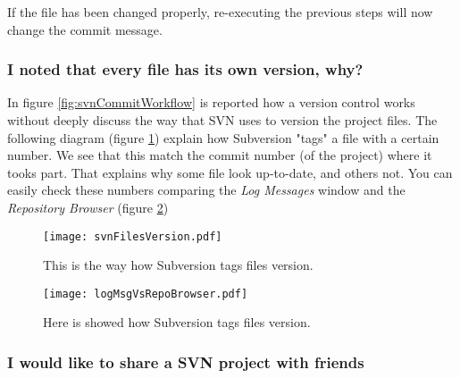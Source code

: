 

If the file has been changed properly, re-executing the previous steps will now change the commit message.







\subsubsection{I noted that every file has its own version, why?}
\label{subsubsectio:FileVersion}

In figure \ref{fig:svnCommitWorkflow} is reported how a version control works without deeply discuss the way that SVN uses to version the project files.
The following diagram (figure \ref{fig:svnFilesVersion}) explain how Subversion "tags" a file with a certain number. We see that this match the commit number (of the project) where it tooks part. That explains why some file look up-to-date, and others not. You can easily check these numbers comparing the \textit{Log Messages} window and the \textit{Repository Browser} (figure \ref{fig:logMsgVsRepoBrowser})



\begin{figure}[htbp]
    \centering
    \texttt{[image: svnFilesVersion.pdf]}
    \caption{This is the way how Subversion tags files version.}
    \label{fig:svnFilesVersion}
\end{figure}




\begin{figure}[htbp]
    \centering
    \texttt{[image: logMsgVsRepoBrowser.pdf]}
    \caption{Here is showed how Subversion tags files version.}
    \label{fig:logMsgVsRepoBrowser}
\end{figure}

\newpage

\subsubsection{I would like to share a SVN project with friends}
\label{subsubsectio:SvnAtHome}

